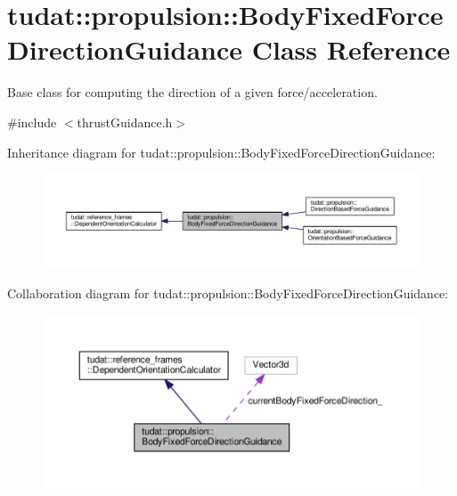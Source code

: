 \hypertarget{classtudat_1_1propulsion_1_1BodyFixedForceDirectionGuidance}{}\section{tudat\+:\+:propulsion\+:\+:Body\+Fixed\+Force\+Direction\+Guidance Class Reference}
\label{classtudat_1_1propulsion_1_1BodyFixedForceDirectionGuidance}


Base class for computing the direction of a given force/acceleration.  




{\ttfamily \#include $<$thrust\+Guidance.\+h$>$}



Inheritance diagram for tudat\+:\+:propulsion\+:\+:Body\+Fixed\+Force\+Direction\+Guidance\+:
\nopagebreak
\begin{figure}[H]
\begin{center}
\leavevmode
\includegraphics[width=350pt]{classtudat_1_1propulsion_1_1BodyFixedForceDirectionGuidance__inherit__graph}
\end{center}
\end{figure}


Collaboration diagram for tudat\+:\+:propulsion\+:\+:Body\+Fixed\+Force\+Direction\+Guidance\+:
\nopagebreak
\begin{figure}[H]
\begin{center}
\leavevmode
\includegraphics[width=350pt]{classtudat_1_1propulsion_1_1BodyFixedForceDirectionGuidance__coll__graph}
\end{center}
\end{figure}
